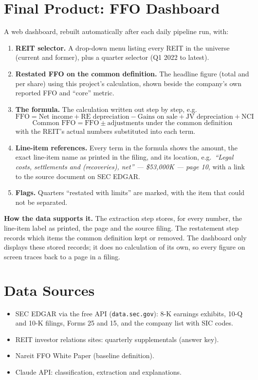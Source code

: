 \documentclass[11pt]{article}
\begin{document}
\section{Final Product: FFO Dashboard}\label{sec:dashboard}

A web dashboard, rebuilt automatically after each daily pipeline run, with:
\begin{enumerate}[itemsep=2pt]
  \item \textbf{REIT selector.} A drop-down menu listing every REIT in the
        universe (current and former), plus a quarter selector (Q1 2022 to latest).
  \item \textbf{Restated FFO on the common definition.} The headline figure
        (total and per share) using this project's calculation, shown beside
        the company's own reported FFO and ``core'' metric.
  \item \textbf{The formula.} The calculation written out step by step, e.g.
        \[
        \text{FFO} = \text{Net income} + \text{RE depreciation} - \text{Gains on sale}
        + \text{JV depreciation} + \text{NCI}
        \]
        \[
        \text{Common FFO} = \text{FFO} \pm \text{adjustments under the common definition}
        \]
        with the REIT's actual numbers substituted into each term.
  \item \textbf{Line-item references.} Every term in the formula shows the
        amount, the exact line-item name as printed in the filing, and its
        location, e.g.\ \textit{``Legal costs, settlements and (recoveries),
        net'' --- \$53,000K --- page 10}, with a link to the source document
        on SEC EDGAR.
  \item \textbf{Flags.} Quarters ``restated with limits'' are marked, with the
        item that could not be separated.
\end{enumerate}

\textbf{How the data supports it.} The extraction step stores, for every
number, the line-item label as printed, the page and the source filing. The
restatement step records which items the common definition kept or removed.
The dashboard only displays these stored records; it does no calculation of
its own, so every figure on screen traces back to a page in a filing.

\section{Data Sources}
\begin{itemize}[itemsep=1pt]
  \item SEC EDGAR via the free API (\texttt{data.sec.gov}): 8-K earnings exhibits,
        10-Q and 10-K filings, Forms 25 and 15, and the company list with SIC codes.
  \item REIT investor relations sites: quarterly supplementals (answer key).
  \item Nareit FFO White Paper (baseline definition).
  \item Claude API: classification, extraction and explanations.
\end{itemize}
\end{document}

